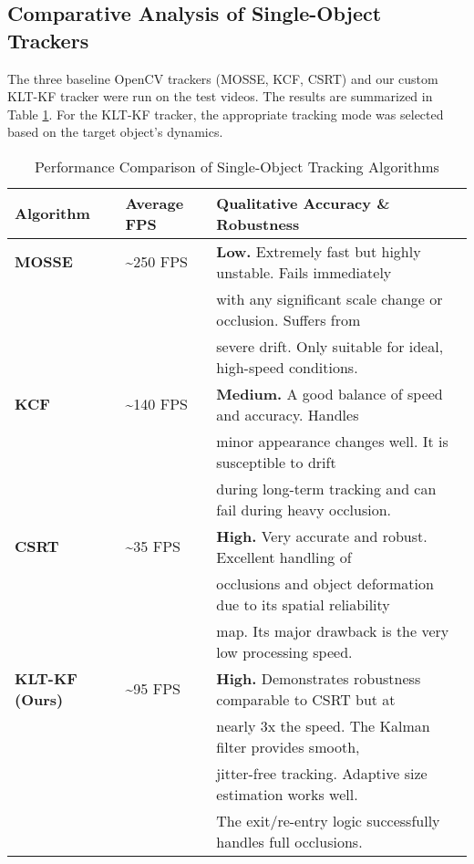 \documentclass[12pt, a4paper]{article}
\begin{document}
\subsection{Comparative Analysis of Single-Object Trackers}
The three baseline OpenCV trackers (MOSSE, KCF, CSRT) and our custom KLT-KF tracker were run on the test videos. The results are summarized in Table \ref{tab:final_comparison}. For the KLT-KF tracker, the appropriate tracking mode was selected based on the target object's dynamics.

\begin{table}[H]
\centering
\caption{Performance Comparison of Single-Object Tracking Algorithms}
\label{tab:final_comparison}
\begin{tabular}{@{}lll@{}}
\toprule
\textbf{Algorithm} & \textbf{Average FPS} & \textbf{Qualitative Accuracy \& Robustness} \\ \midrule
\textbf{MOSSE} & \textasciitilde{}250 FPS & \textbf{Low.} Extremely fast but highly unstable. Fails immediately \\
& & with any significant scale change or occlusion. Suffers from \\
& & severe drift. Only suitable for ideal, high-speed conditions. \\ \addlinespace
\textbf{KCF} & \textasciitilde{}140 FPS & \textbf{Medium.} A good balance of speed and accuracy. Handles \\
& & minor appearance changes well. It is susceptible to drift \\
& & during long-term tracking and can fail during heavy occlusion. \\ \addlinespace
\textbf{CSRT} & \textasciitilde{}35 FPS & \textbf{High.} Very accurate and robust. Excellent handling of \\
& & occlusions and object deformation due to its spatial reliability \\
& & map. Its major drawback is the very low processing speed. \\ \addlinespace
\textbf{KLT-KF (Ours)} & \textasciitilde{}95 FPS & \textbf{High.} Demonstrates robustness comparable to CSRT but at \\
& & nearly 3x the speed. The Kalman filter provides smooth, \\
& & jitter-free tracking. Adaptive size estimation works well. \\
& & The exit/re-entry logic successfully handles full occlusions. \\ \bottomrule
\end{tabular}
\end{table}
\end{document}
